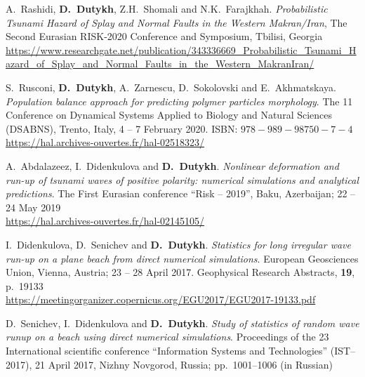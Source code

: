 \documentclass[final, a4paper, oneside, 12pt]{article}
\numberwithin{equation}{section}
\begin{document}
\begin{etaremune}

  
  \item A.~Rashidi, \textbf{D.~Dutykh}, Z.H.~Shomali and N.K.~Farajkhah. \textit{Probabilistic Tsunami Hazard of Splay and Normal Faults in the Western Makran/Iran}, The Second Eurasian RISK-2020 Conference and Symposium, Tbilisi, Georgia \\ %
  \url{https://www.researchgate.net/publication/343336669_Probabilistic_Tsunami_Hazard_of_Splay_and_Normal_Faults_in_the_Western_MakranIran/}
  
  \item S.~Rusconi, \textbf{D.~Dutykh}, A.~Zarnescu, D.~Sokolovski and E.~Akhmatskaya. \textit{Population balance approach for predicting polymer particles morphology}. The 11 Conference on Dynamical Systems Applied to Biology and Natural Sciences (DSABNS), Trento, Italy, 4 -- 7 February 2020. ISBN: $978-989-98750-7-4$ \\ %
  \url{https://hal.archives-ouvertes.fr/hal-02518323/}



  \item A.~Abdalazeez, I.~Didenkulova and \textbf{D.~Dutykh}. \textit{Nonlinear deformation and run-up of tsunami waves of positive polarity: numerical simulations and analytical predictions}. The First Eurasian conference ``Risk -- 2019'', Baku, Azerbaijan; 22 -- 24 May 2019 \\ %
  \url{https://hal.archives-ouvertes.fr/hal-02145105/}
  


  \item I.~Didenkulova, D.~Senichev and \textbf{D.~Dutykh}. \textit{Statistics for long irregular wave run-up on a plane beach from direct numerical simulations}. European Geosciences Union, Vienna, Austria; 23 -- 28 April 2017. Geophysical Research Abstracts, \textbf{19}, p.~19133 \\ %
  \url{https://meetingorganizer.copernicus.org/EGU2017/EGU2017-19133.pdf}
  
  \item D.~Senichev, I.~Didenkulova and \textbf{D.~Dutykh}. \textit{Study of statistics of random wave runup on a beach using direct numerical simulations}. Proceedings of the 23 International scientific conference ``Information Systems and Technologies'' (IST--2017), 21 April 2017, Nizhny Novgorod, Russia; pp.~1001--1006 (in Russian) %
  

\end{etaremune}
\end{document}
